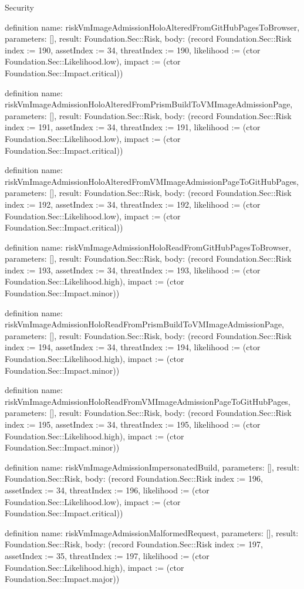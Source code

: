 \begin{lexlean}{Security}
\begin{semanticmodule}
definition{
  name: riskVmImageAdmissionHoloAlteredFromGitHubPagesToBrowser,
  parameters: [],
  result: Foundation.Sec::Risk,
  body: (record Foundation.Sec::Risk {index := 190, assetIndex := 34, threatIndex := 190, likelihood := (ctor Foundation.Sec::Likelihood.low), impact := (ctor Foundation.Sec::Impact.critical)})
}

definition{
  name: riskVmImageAdmissionHoloAlteredFromPrismBuildToVMImageAdmissionPage,
  parameters: [],
  result: Foundation.Sec::Risk,
  body: (record Foundation.Sec::Risk {index := 191, assetIndex := 34, threatIndex := 191, likelihood := (ctor Foundation.Sec::Likelihood.low), impact := (ctor Foundation.Sec::Impact.critical)})
}

definition{
  name: riskVmImageAdmissionHoloAlteredFromVMImageAdmissionPageToGitHubPages,
  parameters: [],
  result: Foundation.Sec::Risk,
  body: (record Foundation.Sec::Risk {index := 192, assetIndex := 34, threatIndex := 192, likelihood := (ctor Foundation.Sec::Likelihood.low), impact := (ctor Foundation.Sec::Impact.critical)})
}

definition{
  name: riskVmImageAdmissionHoloReadFromGitHubPagesToBrowser,
  parameters: [],
  result: Foundation.Sec::Risk,
  body: (record Foundation.Sec::Risk {index := 193, assetIndex := 34, threatIndex := 193, likelihood := (ctor Foundation.Sec::Likelihood.high), impact := (ctor Foundation.Sec::Impact.minor)})
}

definition{
  name: riskVmImageAdmissionHoloReadFromPrismBuildToVMImageAdmissionPage,
  parameters: [],
  result: Foundation.Sec::Risk,
  body: (record Foundation.Sec::Risk {index := 194, assetIndex := 34, threatIndex := 194, likelihood := (ctor Foundation.Sec::Likelihood.high), impact := (ctor Foundation.Sec::Impact.minor)})
}

definition{
  name: riskVmImageAdmissionHoloReadFromVMImageAdmissionPageToGitHubPages,
  parameters: [],
  result: Foundation.Sec::Risk,
  body: (record Foundation.Sec::Risk {index := 195, assetIndex := 34, threatIndex := 195, likelihood := (ctor Foundation.Sec::Likelihood.high), impact := (ctor Foundation.Sec::Impact.minor)})
}

definition{
  name: riskVmImageAdmissionImpersonatedBuild,
  parameters: [],
  result: Foundation.Sec::Risk,
  body: (record Foundation.Sec::Risk {index := 196, assetIndex := 34, threatIndex := 196, likelihood := (ctor Foundation.Sec::Likelihood.low), impact := (ctor Foundation.Sec::Impact.critical)})
}

definition{
  name: riskVmImageAdmissionMalformedRequest,
  parameters: [],
  result: Foundation.Sec::Risk,
  body: (record Foundation.Sec::Risk {index := 197, assetIndex := 35, threatIndex := 197, likelihood := (ctor Foundation.Sec::Likelihood.high), impact := (ctor Foundation.Sec::Impact.major)})
}


\end{semanticmodule}
\end{lexlean}
